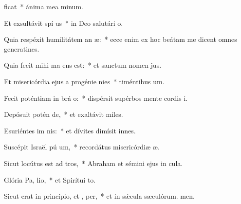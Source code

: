 \item {}ficat~* ánima mea minum.
\item Et exsultávit spí us~* in Deo salutári o.
\item Quia respéxit humilitátem an æ:~* ecce enim ex hoc beátam me dicent omnes generatines.
\item Quia fecit mihi ma  ens est:~* et sanctum nomen jus.
\item Et misericórdia ejus a progénie  nies~* timéntibus um.
\item Fecit poténtiam in brá o:~* dispérsit supérbos mente cordis i.
\item Depósuit potén  de,~* et exaltávit miles.
\item Esuriéntes im nis:~* et dívites dimísit innes.
\item Suscépit Israël pú um,~* recordátus misericórdiæ æ.
\item Sicut locútus est ad  tros,~* Abraham et sémini ejus in cula.
\item Glória Pa,  lio,~* et Spirítui to.
\item Sicut erat in princípio, et ,  per,~* et in sǽcula sæculórum. men.
